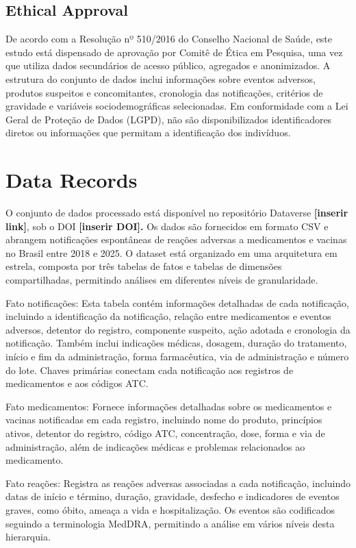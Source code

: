 \documentclass[12pt,a4paper]{article} %
\begin{document}
\subsection{Ethical Approval} 

De acordo com a Resolução nº 510/2016 do Conselho Nacional de Saúde, este estudo está dispensado de aprovação por Comitê de Ética em Pesquisa, uma vez que utiliza dados secundários de acesso público, agregados e anonimizados. A estrutura do conjunto de dados inclui informações sobre eventos adversos, produtos suspeitos e concomitantes, cronologia das notificações, critérios de gravidade e variáveis sociodemográficas selecionadas. Em conformidade com a Lei Geral de Proteção de Dados (LGPD), não são disponibilizados identificadores diretos ou informações que permitam a identificação dos indivíduos.

\section{Data Records}

O conjunto de dados processado está disponível no repositório Dataverse \textbf{[inserir link]}, sob o DOI \textbf{[inserir DOI].} Os dados são fornecidos em formato CSV e abrangem notificações espontâneas de reações adversas a medicamentos e vacinas no Brasil entre 2018 e 2025. O dataset está organizado em uma arquitetura em estrela, composta por três tabelas de fatos e tabelas de dimensões compartilhadas, permitindo análises em diferentes níveis de granularidade.

Fato notificações: Esta tabela contém informações detalhadas de cada notificação, incluindo a identificação da notificação, relação entre medicamentos e eventos adversos, detentor do registro, componente suspeito, ação adotada e cronologia da notificação. Também inclui indicações médicas, dosagem, duração do tratamento, início e fim da administração, forma farmacêutica, via de administração e número do lote. Chaves primárias conectam cada notificação aos registros de medicamentos e aos códigos ATC.

Fato medicamentos: Fornece informações detalhadas sobre os medicamentos e vacinas notificadas em cada registro, incluindo nome do produto, princípios  ativos, detentor do registro,  código ATC, concentração, dose, forma e via de  administração, além de indicações  médicas  e problemas relacionados ao medicamento.

Fato reações: Registra as reações adversas  associadas a cada  notificação, incluindo  datas  de início e término, duração,  gravidade, desfecho e indicadores de eventos graves, como óbito,  ameaça a  vida e hospitalização. Os eventos são codificados seguindo a terminologia MedDRA, permitindo a análise em vários níveis desta hierarquia.
\end{document}
